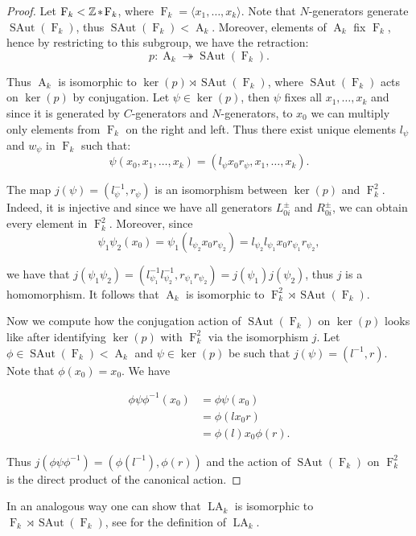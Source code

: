 \documentclass[12pt]{amsart}
\theoremstyle{definition}
\numberwithin{figure}{section}
\numberwithin{table}{section}
\numberwithin{equation}{section}
\newcommand{\la}{\langle}
\newcommand{\ra}{\rangle}
\newcommand{\OP}[1]{\operatorname{#1}}
\newcommand{\SAut}{\operatorname{SAut}}
\newcommand{\F}{\operatorname{F}}
\newcommand{\A}{\operatorname{A}}
\newcommand{\myast}{\hspace{-1pt} \ast \hspace{-1pt}}
\newcommand{\FP}{\mathbb{Z} \myast \F_k}
\begin{document}
\begin{proof}
Let $\F_k < \FP$, where $\F_k = \la x_1,\ldots,x_k \ra$.
Note that $N$-generators generate $\SAut(\F_k)$, thus $\SAut(\F_k) < \A_k$.
Moreover, elements of $\A_k$ fix $\F_k$, hence by restricting to this subgroup, we have the retraction:
$$
p \colon \A_k \twoheadrightarrow \SAut(\F_k).
$$

Thus $\A_k$ is isomorphic to $\ker(p) \rtimes \SAut(\F_k)$, where $\SAut(\F_k)$ acts on $\ker(p)$ by conjugation. 
Let $\psi \in \ker(p)$, then $\psi$ fixes all $x_1,\ldots,x_k$ and since it is generated by $C$-generators and $N$-generators, to $x_0$ we can multiply only elements from $\F_k$ on the right and left. Thus there exist unique elements $l_{\psi}$ and $w_{\psi}$ in $\F_k$ such that:  
$$\psi(x_0,x_1,\ldots,x_k) = (l_{\psi}x_0r_{\psi},x_1,\ldots,x_k).$$

The map $j(\psi) = (l_\psi^{-1},r_{\psi})$ is an isomorphism between $\ker(p)$ and $\F_k^2$. Indeed, it is injective and since we have all generators $L^{\pm}_{0i}$ and $R^{\pm}_{0i}$, we can obtain every element in $\F_k^2$. Moreover, since
$$
\psi_1\psi_2(x_0) = \psi_1(l_{\psi_2}x_0r_{\psi_2}) = l_{\psi_2}l_{\psi_1}x_0r_{\psi_1}r_{\psi_2},
$$

we have that $j(\psi_1\psi_2) = (l_{\psi_1}^{-1}l_{\psi_2}^{-1},r_{\psi_1}r_{\psi_2}) = j(\psi_1)j(\psi_2)$, thus $j$ is a homomorphism. It follows that $\A_k$ is isomorphic to $\F_k^2 \rtimes \SAut(\F_k)$.

Now we compute how the conjugation action of $\SAut(\F_k)$ on $\ker(p)$ looks like after identifying $\ker(p)$ with $\F_k^2$ via the isomorphism $j$. Let $\phi \in \SAut(\F_k) < \A_k$ and $\psi \in \ker(p)$ be such that $j(\psi) = (l^{-1},r)$. Note that $\phi(x_0) = x_0$. We have 

\begin{align*}
\phi \psi \phi^{-1} (x_0) & =\phi \psi (x_0)\\
& = \phi (lx_0r)\\
&=\phi(l)x_0\phi(r).
\end{align*}

Thus $j(\phi \psi \phi^{-1}) = (\phi(l^{-1}),\phi(r))$ and the action of $\SAut(\F_k)$ on $\F_k^2$ is the direct product of the canonical action.

\end{proof}

In an analogous way one can show that $\OP{LA}_k$ is isomorphic to $\F_k \rtimes \SAut(\F_k)$, see  for the definition of $\OP{LA}_k$.
\end{document}
